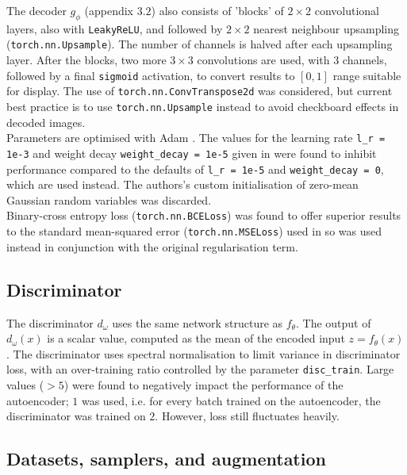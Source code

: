 \documentclass[11pt]{article} %
\begin{document}
The decoder $g_\phi$ (appendix $3.2$) also consists of 'blocks' of $2 \times 2$ convolutional layers, also with \verb|LeakyReLU|, and followed by $2 \times 2$ nearest neighbour upsampling (\verb|torch.nn.Upsample|). The number of channels is halved after each upsampling layer. After the blocks, two more $3 \times 3$ convolutions are used, with $3$ channels, followed by a final \verb|sigmoid| activation, to convert results to $[0, 1]$ range suitable for display. The use of \verb|torch.nn.ConvTranspose2d| was considered, but current best practice is to use \verb|torch.nn.Upsample| instead to avoid checkboard effects in decoded images.\\ 

Parameters are optimised with Adam \cite{kingma_welling_2014}. The values for the learning rate \verb|l_r = 1e-3| and weight decay \verb|weight_decay = 1e-5| given in \cite{berthelot_et_al_2019} were found to inhibit performance compared to the defaults of \verb|l_r = 1e-5| and \verb|weight_decay = 0|, which are used instead. The authors's custom initialisation of zero-mean Gaussian random variables was discarded. \\

Binary-cross entropy loss (\verb|torch.nn.BCELoss|) was found to offer superior results to the standard mean-squared error (\verb|torch.nn.MSELoss|) used in \cite{berthelot_et_al_2019} so was used instead in conjunction with the original regularisation term.

\subsection{Discriminator}

The discriminator $d_\omega$ uses the same network structure as $f_\theta$. The output of $d_\omega(x)$ is a scalar value, computed as the mean of the encoded input $z = f_\theta(x)$. The discriminator uses spectral normalisation \cite{miyato_2018} to limit variance in discriminator loss, with an over-training ratio controlled by the parameter \verb|disc_train|. Large values ($ >5$) were found to negatively impact the performance of the autoencoder; $1$ was used, i.e. for every batch trained on the autoencoder, the discriminator was trained on $2$. However, loss still fluctuates heavily. 

\subsection{Datasets, samplers, and augmentation}
\end{document}
